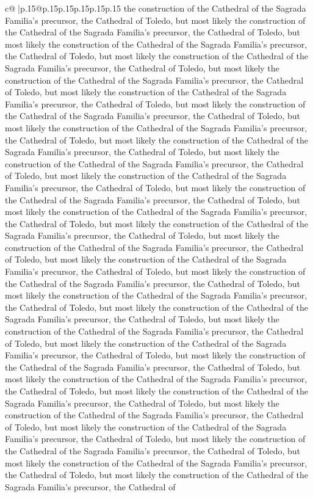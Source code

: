 \documentclass{article}
\begin{document}
{\begin{supertabular}{c@{$\;$}|p{.15\linewidth}@{}p{.15\linewidth}p{.15\linewidth}p{.15\linewidth}p{.15\linewidth}p{.15\linewidth}}
{{{the construction of the Cathedral of the Sagrada Familia's precursor, the Cathedral of Toledo, but most likely the construction of the Cathedral of the Sagrada Familia's precursor, the Cathedral of Toledo, but most likely the construction of the Cathedral of the Sagrada Familia's precursor, the Cathedral of Toledo, but most likely the construction of the Cathedral of the Sagrada Familia's precursor, the Cathedral of Toledo, but most likely the construction of the Cathedral of the Sagrada Familia's precursor, the Cathedral of Toledo, but most likely the construction of the Cathedral of the Sagrada Familia's precursor, the Cathedral of Toledo, but most likely the construction of the Cathedral of the Sagrada Familia's precursor, the Cathedral of Toledo, but most likely the construction of the Cathedral of the Sagrada Familia's precursor, the Cathedral of Toledo, but most likely the construction of the Cathedral of the Sagrada Familia's precursor, the Cathedral of Toledo, but most likely the construction of the Cathedral of the Sagrada Familia's precursor, the Cathedral of Toledo, but most likely the construction of the Cathedral of the Sagrada Familia's precursor, the Cathedral of Toledo, but most likely the construction of the Cathedral of the Sagrada Familia's precursor, the Cathedral of Toledo, but most likely the construction of the Cathedral of the Sagrada Familia's precursor, the Cathedral of Toledo, but most likely the construction of the Cathedral of the Sagrada Familia's precursor, the Cathedral of Toledo, but most likely the construction of the Cathedral of the Sagrada Familia's precursor, the Cathedral of Toledo, but most likely the construction of the Cathedral of the Sagrada Familia's precursor, the Cathedral of Toledo, but most likely the construction of the Cathedral of the Sagrada Familia's precursor, the Cathedral of Toledo, but most likely the construction of the Cathedral of the Sagrada Familia's precursor, the Cathedral of Toledo, but most likely the construction of the Cathedral of the Sagrada Familia's precursor, the Cathedral of Toledo, but most likely the construction of the Cathedral of the Sagrada Familia's precursor, the Cathedral of Toledo, but most likely the construction of the Cathedral of the Sagrada Familia's precursor, the Cathedral of Toledo, but most likely the construction of the Cathedral of the Sagrada Familia's precursor, the Cathedral of Toledo, but most likely the construction of the Cathedral of the Sagrada Familia's precursor, the Cathedral of Toledo, but most likely the construction of the Cathedral of the Sagrada Familia's precursor, the Cathedral of Toledo, but most likely the construction of the Cathedral of the Sagrada Familia's precursor, the Cathedral of Toledo, but most likely the construction of the Cathedral of the Sagrada Familia's precursor, the Cathedral of Toledo, but most likely the construction of the Cathedral of the Sagrada Familia's precursor, the Cathedral of Toledo, but most likely the construction of the Cathedral of the Sagrada Familia's precursor, the Cathedral of Toledo, but most likely the construction of the Cathedral of the Sagrada Familia's precursor, the Cathedral of }}}
\end{supertabular}}
\end{document}
